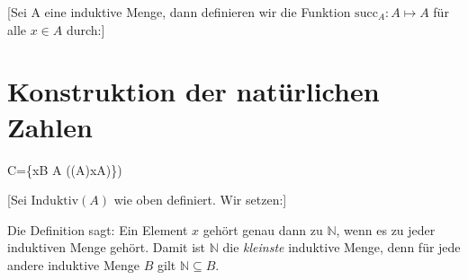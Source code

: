 \documentclass[main.tex]{subfiles}
\begin{document}
[Sei A eine induktive Menge, dann definieren wir die Funktion \(\mathrm{succ}_A:A\mapsto A\)  für alle \(x\in A\) durch:]

\section{Konstruktion der natürlichen Zahlen}

\begin{tabproofwide}
    {}

    {}
  \proofstepwide{}{}%
    {C=\{x\in B \mid \forall A ((A)\rightarrow x\in A)\})}%
    {}
\end{tabproofwide}


[Sei \(\mathrm{Induktiv}(A)\) wie oben definiert.  Wir setzen:]

\begin{remark}
  Die Definition sagt: Ein Element \(x\) gehört genau dann zu \(\mathbb{N}\), wenn es zu jeder induktiven Menge gehört.  Damit ist \(\mathbb{N}\) die \emph{kleinste} induktive Menge, denn für jede andere induktive Menge \(B\) gilt \(\mathbb{N} \subseteq B\).
\end{remark}

\begin{tabproofwide}
\end{tabproofwide}
\end{document}
